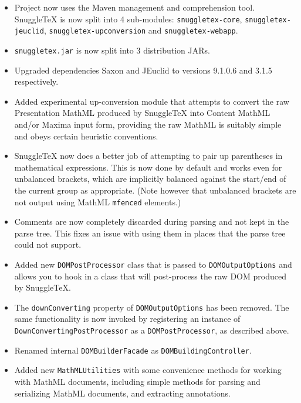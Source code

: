 \begin{itemize}

  \item Project now uses the Maven management and comprehension tool. SnuggleTeX
    is now split into 4 sub-modules: \verb|snuggletex-core|, \verb|snuggletex-jeuclid|,
    \verb|snuggletex-upconversion| and \verb|snuggletex-webapp|.

  \item \verb|snuggletex.jar| is now split into 3 distribution JARs.

  \item Upgraded dependencies Saxon and JEuclid to versions 9.1.0.6 and 3.1.5
    respectively.

  \item Added experimental up-conversion module that attempts to convert the raw
    Presentation MathML produced by SnuggleTeX into Content MathML and/or Maxima
    input form, providing the raw MathML is suitably simple and obeys certain
    heuristic conventions.

  \item SnuggleTeX now does a better job of attempting to pair up parentheses in
    mathematical expressions. This is now done by default and works even for unbalanced
    brackets, which are implicitly balanced against the start/end of the current group
    as appropriate. (Note however that unbalanced brackets are not output using
    MathML \verb|mfenced| elements.)

  \item Comments are now completely discarded during parsing and not kept in the
    parse tree. This fixes an issue with using them in places that the parse tree
    could not support.

  \item Added new \verb|DOMPostProcessor| class that is passed to \verb|DOMOutputOptions|
    and allows you to hook in a class that will post-process the raw DOM produced
    by SnuggleTeX.

  \item The \verb|downConverting| property of \verb|DOMOutputOptions| has been removed.
    The same functionality is now invoked by registering an instance of
    \verb|DownConvertingPostProcessor| as a \verb|DOMPostProcessor|, as described
    above.

  \item Renamed internal \verb|DOMBuilderFacade| as \verb|DOMBuildingController|.

  \item Added new \verb|MathMLUtilities| with some convenience methods for working with MathML
    documents, including simple methods for parsing and serializing MathML
    documents, and extracting annotations.


\end{itemize}

